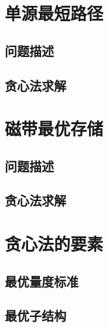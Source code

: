 \section{单源最短路径}
\subsection*{问题描述}
\subsection*{贪心法求解}
\section{磁带最优存储}
\subsection*{问题描述}
\subsection*{贪心法求解}
\section{贪心法的要素}
\subsection*{最优量度标准}
\subsection*{最优子结构}